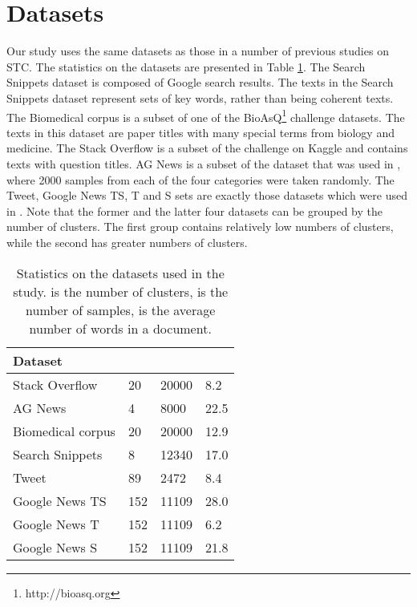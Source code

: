\documentclass[11pt,a4paper]{article}
\begin{document}
\section{Datasets}
Our study uses the same datasets as those in a number of previous studies \cite{xu2017self,hadifar2019self,rakib2020enhancement} on STC. The statistics on the datasets are presented in Table \ref{statistics}. The Search Snippets dataset is composed of Google search results. The texts in the Search Snippets dataset represent sets of key words, rather than being coherent texts. The Biomedical corpus is a subset of one of the BioAsQ\footnote{http://bioasq.org} challenge datasets. The texts in this dataset are paper titles with many special terms from biology and medicine. The Stack Overflow is a subset of the challenge on Kaggle and contains texts with question titles. AG News is a subset of the dataset that was used in \cite{zhang2015text}, where 2000 samples from each of the four categories were taken randomly. The Tweet, Google News TS, T and S sets are exactly those datasets which were used in \cite{yin2014dirichlet}. Note that the former and the latter four datasets can be grouped by the number of clusters. The first group contains relatively low numbers of clusters, while the second has greater numbers of clusters.  
\begin{table}
\centering
\begin{tabular}{llll}
\hline
\textbf{Dataset} &  &  &  \\
\hline
Stack Overflow & 20 & 20000 & 8.2 \\
\hline
AG News & 4 & 8000 & 22.5 \\
\hline
Biomedical corpus & 20 & 20000 & 12.9 \\
\hline
Search Snippets & 8 & 12340 & 17.0 \\
\hline
Tweet & 89 & 2472 & 8.4 \\
\hline
Google News TS & 152 & 11109 & 28.0 \\
\hline
Google News T & 152 & 11109 & 6.2 \\
\hline
Google News S & 152 & 11109 & 21.8 \\
\hline

\end{tabular}
\caption{Statistics on the datasets used in the study.  is the number of clusters,  is the number of samples,  is the average number of words in a document.}
\label{statistics}
\end{table}
\end{document}
